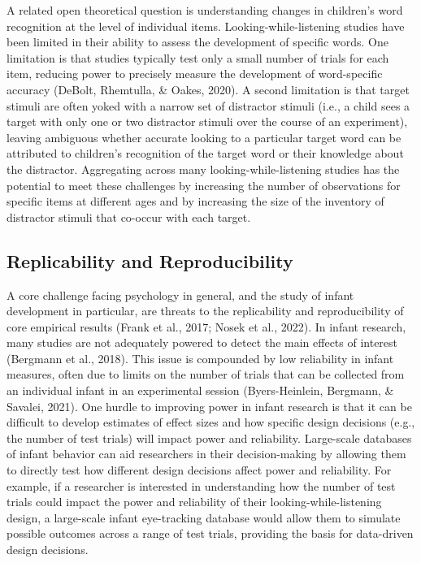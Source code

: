 \documentclass[
  english,
  man,floatsintext]{apa6}
\providecommand{\DIFaddtex}[1]{{\protect\color{blue}{#1}}} %
\providecommand{\DIFdeltex}[1]{}                      %
\providecommand{\DIFaddbegin}{} %
\providecommand{\DIFaddend}{} %
\providecommand{\DIFdelbegin}{} %
\providecommand{\DIFdelend}{} %
\providecommand{\DIFadd}[1]{\texorpdfstring{\DIFaddtex{#1}}{#1}} %
\providecommand{\DIFdel}[1]{\texorpdfstring{\DIFdeltex{#1}}{}} %
\newcommand{\DIFscaledelfig}{0.5}
\newlength{\DIFdelgraphicswidth} %
\newlength{\DIFdelgraphicsheight} %
\newcommand{\DIFaddincludegraphics}[2][]{{\color{blue}\fbox{\DIFOincludegraphics[#1]{#2}}}} %
\newcommand{\DIFdelincludegraphics}[2][]{%
\sbox{\DIFdelgraphicsbox}{\DIFOincludegraphics[#1]{#2}}%
\settoboxwidth{\DIFdelgraphicswidth}{\DIFdelgraphicsbox} %
\settoboxtotalheight{\DIFdelgraphicsheight}{\DIFdelgraphicsbox} %
\scalebox{\DIFscaledelfig}{%
\parbox[b]{\DIFdelgraphicswidth}{\usebox{\DIFdelgraphicsbox}\\[-\baselineskip] \rule{\DIFdelgraphicswidth}{0em}}\llap{\resizebox{\DIFdelgraphicswidth}{\DIFdelgraphicsheight}{%
\setlength{\unitlength}{\DIFdelgraphicswidth}%
\begin{picture}(1,1)%
\thicklines\linethickness{2pt} %
{\color[rgb]{1,0,0}\put(0,0){\framebox(1,1){}}}%
{\color[rgb]{1,0,0}\put(0,0){\line( 1,1){1}}}%
{\color[rgb]{1,0,0}\put(0,1){\line(1,-1){1}}}%
\end{picture}%
}\hspace*{3pt}}} %
} %
\DeclareRobustCommand{\DIFaddbegin}{\DIFOaddbegin \let\includegraphics\DIFaddincludegraphics} %
\DeclareRobustCommand{\DIFaddend}{\DIFOaddend \let\includegraphics\DIFOincludegraphics} %
\DeclareRobustCommand{\DIFdelbegin}{\DIFOdelbegin \let\includegraphics\DIFdelincludegraphics} %
\DeclareRobustCommand{\DIFdelend}{\DIFOaddend \let\includegraphics\DIFOincludegraphics} %
\begin{document}
A related open theoretical question is understanding changes in children's word recognition at the level of individual items.
Looking-while-listening studies have been limited in their ability to assess the development of specific words.
One limitation is that studies typically test only a small number of trials for each item, reducing power to precisely measure the development of word-specific accuracy (DeBolt, Rhemtulla, \& Oakes, 2020).
A second limitation is that target stimuli are often yoked with a narrow set of distractor stimuli (i.e., a child sees a target with only one or two distractor stimuli over the course of an experiment), leaving ambiguous whether accurate looking to a particular target word can be attributed to children's recognition of the target word or their knowledge about the distractor.
Aggregating across many looking-while-listening studies has the potential to meet these challenges by increasing the number of observations for specific items at different ages and by increasing the size of the inventory of distractor stimuli that co-occur with each target.

\hypertarget{replicability-and-reproducibility}{%
\subsection{Replicability and Reproducibility}\label{replicability-and-reproducibility}}

A core challenge facing psychology in general, and the study of infant development in particular, are threats to the replicability and reproducibility of core empirical results (Frank et al., 2017; Nosek et al., 2022).
In infant research, many studies are not adequately powered to detect the main effects of interest (Bergmann et al., 2018).
This issue is compounded by low reliability in infant measures, often due to limits on the number of trials that can be collected from an individual infant in an experimental session (Byers-Heinlein, Bergmann, \& Savalei, 2021).
One hurdle to improving power in infant research is that it can be difficult to develop \DIFdelbegin \DIFdel{a priori }\DIFdelend \DIFaddbegin \emph{\DIFadd{a priori}} \DIFaddend estimates of effect sizes and how specific design decisions (e.g., the number of test trials) will impact power and reliability.
Large-scale databases of infant behavior can aid researchers in their decision-making by allowing them to directly test how different design decisions affect power and reliability.
For example, if a researcher is interested in understanding how the number of test trials could impact the power and reliability of their looking-while-listening design, a large-scale infant eye-tracking database would allow them to simulate possible outcomes across a range of test trials, providing the basis for data-driven design decisions.
\end{document}
